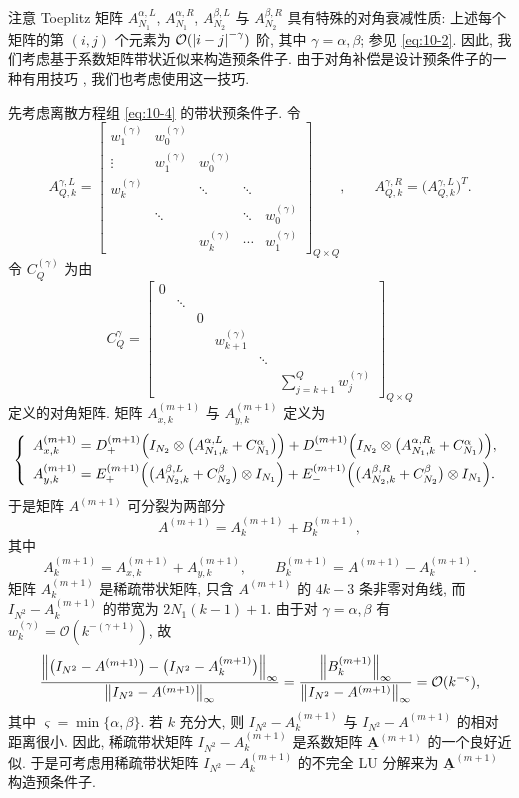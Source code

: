注意 Toeplitz 矩阵 $A_{N_{1}}^{\alpha,L}$, $A_{N_{1}}^{\alpha,R}$, $A_{N_{2}}^{\beta,L}$ 与 $A_{N_{2}}^{\beta,R}$ 具有特殊的对角衰减性质: 上述每个矩阵的第 $(i,j)$ 个元素为 $\mathcal{O}(\left|i-j\right|^{-\gamma})$ 阶, 其中 $\gamma=\alpha,\beta$; 参见 \eqref{eq:10-2}. 因此, 我们考虑基于系数矩阵带状近似来构造预条件子. 由于对角补偿是设计预条件子的一种有用技巧 \cite{src:2,src:59}, 我们也考虑使用这一技巧.

先考虑离散方程组 \eqref{eq:10-4} 的带状预条件子. 令
\[
  A_{Q,k}^{\gamma,L}=
  \begin{bmatrix}
    w_{1}^{(\gamma)} & w_{0}^{(\gamma)} & & & \\
    \vdots & w_{1}^{(\gamma)} & w_{0}^{(\gamma)} & & \\
    w_{k}^{(\gamma)} & & \ddots & \ddots & \\
    & \ddots & & \ddots & w_{0}^{(\gamma)}\\
    & & w_{k}^{(\gamma)} & \cdots & w_{1}^{(\gamma)}
  \end{bmatrix}_{Q\times Q},
  \qquad
  A_{Q,k}^{\gamma,R}=\bigl(A_{Q,k}^{\gamma,L}\bigr)^{T}.
\]
令 $C_{Q}^{(\gamma)}$ 为由
\[
  C_{Q}^{\gamma}=
  \begin{bmatrix}
    0 & & & & & \\
    & \ddots & & & & \\
    & & 0 & & & \\
    & & & w_{k+1}^{(\gamma)} & & \\
    & & & & \ddots & \\
    & & & & & \displaystyle\sum_{j=k+1}^{Q}w_{j}^{(\gamma)}
  \end{bmatrix}_{Q\times Q}
\]
定义的对角矩阵. 矩阵 $A_{x,k}^{(m+1)}$ 与 $A_{y,k}^{(m+1)}$ 定义为
\[
\left\{
\begin{array}{l}
A_{x,k}^{(m+1)}=D_{+}^{(m+1)}\Bigl(I_{N_{2}}\otimes\bigl(A_{N_{1},k}^{\alpha,L}+C_{N_{1}}^{\alpha}\bigr)\Bigr)
 +D_{-}^{(m+1)}\Bigl(I_{N_{2}}\otimes\bigl(A_{N_{1},k}^{\alpha,R}+C_{N_{1}}^{\alpha}\bigr)\Bigr),\\[2mm]
A_{y,k}^{(m+1)}=E_{+}^{(m+1)}\Bigl(\bigl(A_{N_{2},k}^{\beta,L}+C_{N_{2}}^{\beta}\bigr)\otimes I_{N_{1}}\Bigr)
 +E_{-}^{(m+1)}\Bigl(\bigl(A_{N_{2},k}^{\beta,R}+C_{N_{2}}^{\beta}\bigr)\otimes I_{N_{1}}\Bigr).
\end{array}
\right.
\]
于是矩阵 $A^{(m+1)}$ 可分裂为两部分
\[
  A^{(m+1)}=A_{k}^{(m+1)}+B_{k}^{(m+1)},
\]
其中
\[
  A_{k}^{(m+1)}=A_{x,k}^{(m+1)}+A_{y,k}^{(m+1)},\qquad
  B_{k}^{(m+1)}=A^{(m+1)}-A_{k}^{(m+1)}.
\]
矩阵 $A_{k}^{(m+1)}$ 是稀疏带状矩阵, 只含 $A^{(m+1)}$ 的 $4k-3$ 条非零对角线, 而 $I_{N^{2}}-A_{k}^{(m+1)}$ 的带宽为 $2N_{1}(k-1)+1$. 由于对 $\gamma=\alpha,\beta$ 有 $w_{k}^{(\gamma)}=\mathcal{O}(k^{-(\gamma+1)})$, 故
\[
  \frac{\left\|\bigl(I_{N^{2}}-A^{(m+1)}\bigr)-\bigl(I_{N^{2}}-A_{k}^{(m+1)}\bigr)\right\|_{\infty}}
       {\left\|I_{N^{2}}-A^{(m+1)}\right\|_{\infty}}
  =\frac{\left\|B_{k}^{(m+1)}\right\|_{\infty}}{\left\|I_{N^{2}}-A^{(m+1)}\right\|_{\infty}}
  =\mathcal{O}(k^{-\varsigma}),
\]
其中 $\varsigma=\min\{\alpha,\beta\}$. 若 $k$ 充分大, 则 $I_{N^{2}}-A_{k}^{(m+1)}$ 与 $I_{N^{2}}-A^{(m+1)}$ 的相对距离很小. 因此, 稀疏带状矩阵 $I_{N^{2}}-A_{k}^{(m+1)}$ 是系数矩阵 $\underline{\mathbf{A}}^{(m+1)}$ 的一个良好近似. 于是可考虑用稀疏带状矩阵 $I_{N^{2}}-A_{k}^{(m+1)}$ 的不完全 LU 分解来为 $\underline{\mathbf{A}}^{(m+1)}$ 构造预条件子.

